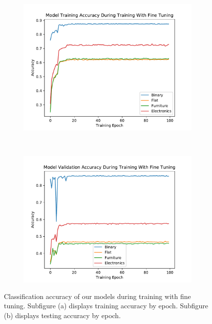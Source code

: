 \begin{figure}
    \centering
    \begin{subfigure}[t]{0.5\columnwidth}
        \centering
        \includegraphics[width=\textwidth]{img/true_accs_train}
        \caption{}
    \end{subfigure}%
    ~ 
    \begin{subfigure}[t]{0.5\columnwidth}
        \centering
        \includegraphics[width=\textwidth]{img/true_accs_val}
        \caption{}
    \end{subfigure}%
	\caption{
Classification accuracy of our models during training with fine tuning.
Subfigure (a) displays training accuracy by epoch.
Subfigure (b) displays testing accuracy by epoch. 
}
	\label{fig:true_accs}
\end{figure}